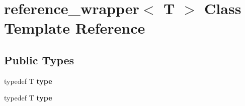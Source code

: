 \hypertarget{classreference__wrapper}{}\section{reference\+\_\+wrapper$<$ T $>$ Class Template Reference}
\label{classreference__wrapper}
\subsection*{Public Types}
\begin{DoxyCompactItemize}
\item 
typedef T {\bfseries type}\hypertarget{classreference__wrapper_afe8948e5225187acbab9751c628a51d9}{}\label{classreference__wrapper_afe8948e5225187acbab9751c628a51d9}

\item 
typedef T {\bfseries type}\hypertarget{classreference__wrapper_afe8948e5225187acbab9751c628a51d9}{}\label{classreference__wrapper_afe8948e5225187acbab9751c628a51d9}

\end{DoxyCompactItemize}
